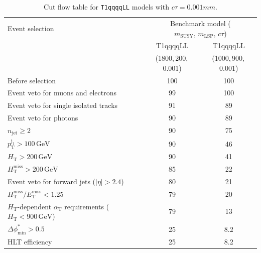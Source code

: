 \clearpage
\begin{table}[!h]
  \caption{Cut flow table for \texttt{T1qqqqLL} models with $c\tau = 0.001\unit{mm}$.} 
  \label{tab:cut_flow_ctau_0p001}
{\scriptsize%
\centering
\begin{tabular}{lcc}
  \hline
  Event selection & \multicolumn{2}{c}{Benchmark model ($m_\mathrm{SUSY},\,m_\mathrm{LSP},\,c\tau$)} \\
  \cline{2-3}
   & T1qqqqLL & T1qqqqLL \\
   & (1800,\,200,\,0.001) & (1000,\,900,\,0.001) \\
  \hline
  Before selection & 100\phantom{.1} & 100\phantom{.1} \\
  Event veto for muons and electrons & \phantom{1}99\phantom{.1} & 100\phantom{.1} \\
  Event veto for single isolated tracks & \phantom{1}91\phantom{.1} & \phantom{1}89\phantom{.1}  \\
  Event veto for photons & \phantom{1}90\phantom{.1} & \phantom{1}89\phantom{.1} \\
   $n_{\mathrm{jet}} \geq 2$ & \phantom{1}90\phantom{.1} & \phantom{1}75\phantom{.1}  \\
   $p_{\mathrm{T}}^{\mathrm{j_1}} > 100\,\mathrm{GeV}$ & \phantom{1}90\phantom{.1} & \phantom{1}46\phantom{.1} \\
   $H_{\mathrm{T}} > 200\,\mathrm{GeV}$ & \phantom{1}90\phantom{.1} & \phantom{1}41\phantom{.1}  \\
  $H_{\mathrm{T}}^{\mathrm{miss}} > 200\,\mathrm{GeV}$ & \phantom{1}85\phantom{.1} & \phantom{1}22\phantom{.1}  \\
  Event veto for forward jets ($|\eta| > 2.4$) & \phantom{1}80\phantom{.1} & \phantom{1}21\phantom{.1}  \\
  $H_{\mathrm{T}}^{\mathrm{miss}} / E_{\mathrm{T}}^{\mathrm{miss}} < 1.25$ & \phantom{1}79\phantom{.1} & \phantom{1}20\phantom{.1}  \\
  $H_{\mathrm{T}}$-dependent $\alpha_{\mathrm{T}}$ requirements ($H_{\mathrm{T}} < 900\,\mathrm{GeV}$) & \phantom{1}79\phantom{.1} & \phantom{1}13\phantom{.1} \\
  $\Delta\phi^{*}_{\mathrm{min}} > 0.5$ & \phantom{1}25\phantom{.1} & \phantom{10}8.2  \\
  \hline
  HLT efficiency & \phantom{1}25\phantom{.1} & \phantom{10}8.2 \\
  \hline
\end{tabular}
}
\end{table}

